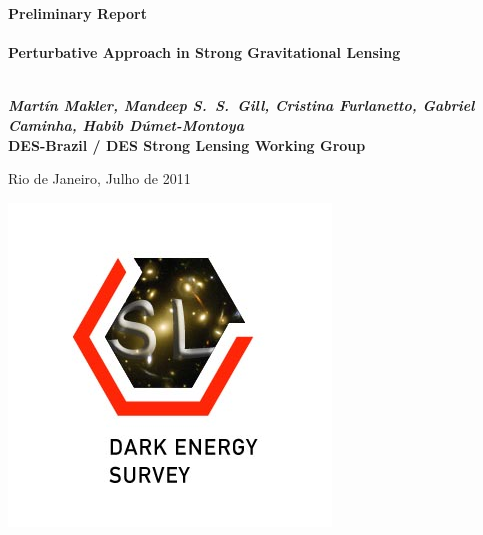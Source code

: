\begin{titlepage}

\begin{center}



\textbf{\Large Preliminary Report  }\\[3.5cm]

\HRule \\[0.6cm]
{ \large \bfseries Perturbative Approach in Strong Gravitational Lensing}\\[0.4cm]

\HRule \\[1.0cm]

\vspace{2.0cm}

{\Large \textbf{\textit{Mart\'in Makler, Mandeep S.~S.~Gill, Cristina Furlanetto, Gabriel Caminha, Habib D\'umet-Montoya}}}\\
{\large \textbf{DES-Brazil / DES Strong Lensing Working Group}}\\[1.5cm]

\vfill

{\large Rio de Janeiro, Julho de 2011}

\end{center}

\begin{flushright}
    \includegraphics[scale=0.5]{graphics/SLSG-Logo.jpg}
\end{flushright}

\end{titlepage} 